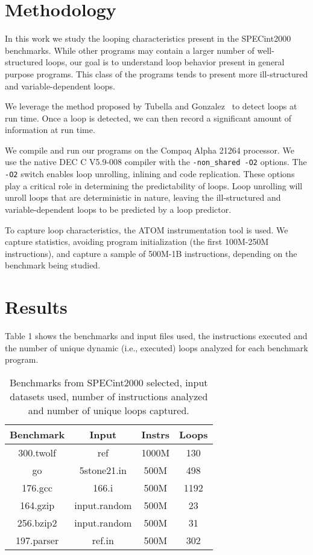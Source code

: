 \documentclass[times,10pt,twocolumn]{article}
\begin{document}
\section {Methodology}
In this work we study the looping characteristics present in the SPECint2000 
benchmarks. While other programs may contain a larger number of well-structured
loops, our goal is to understand loop behavior present in general purpose
programs.  This class of the programs tends to present more ill-structured and 
variable-dependent loops.

We leverage the method proposed by Tubella and Gonzalez~\cite{Tub98} 
to detect loops at run time. Once 
a loop is detected, we can then record a significant amount of information at run time. 

We compile and run our programs on the Compaq Alpha 21264 processor.
We use the native DEC C V5.9-008 compiler with the {\tt -non\_shared -O2} options.
The {\tt -O2} switch enables loop unrolling, inlining and code replication.
These options play a critical role in determining the predictability
of loops.  Loop unrolling will unroll loops that are deterministic in
nature, leaving the  ill-structured and variable-dependent loops to be 
predicted by a loop predictor.

To capture loop characteristics, the ATOM instrumentation tool \cite{Sri94} 
is used.  We capture statistics, avoiding program initialization (the
first 100M-250M instructions), and capture a sample of 500M-1B instructions,
depending on the benchmark being studied. 

\section{Results}

Table 1 shows the benchmarks and 
input files used, the instructions executed and the number of unique dynamic
(i.e., executed) loops analyzed for each benchmark program.

\begin{table}[htb]
\caption{Benchmarks from SPECint2000 selected, input datasets used, number of instructions
analyzed and number of unique loops captured.}
{\footnotesize
\begin{center}
\begin{tabular}{|c|c|c|c|}
\hline 
Benchmark & Input & Instrs & Loops\\
\hline \hline 
300.twolf & ref & 1000M & 130 \\ \hline 
go & 5stone21.in & 500M & 498 \\ \hline 
176.gcc & 166.i & 500M & 1192 \\ \hline 
164.gzip & input.random & 500M & 23 \\ \hline 
256.bzip2 & input.random & 500M & 31 \\ \hline 
197.parser & ref.in & 500M & 302 \\ \hline
\end{tabular}
\end{center}
}
\end{table}
\end{document}
